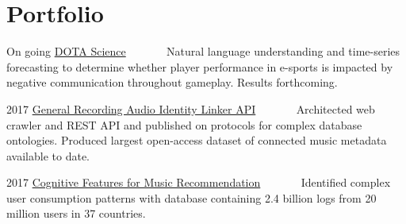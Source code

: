 \documentclass[letterpaper]{twentysecondcv} %
\begin{document}
\section{Portfolio}
\begin{portfolio}
\portfolioitem
    {On going}
    {\href{https://www.github.com/mmustaine/DOTA-Science}{DOTA Science}}
    {\faAndroid~~\faLineChart~~\faCommenting~~\faFileTextO}
    {
    {Natural language understanding and time-series forecasting to determine whether player performance in e-sports is impacted by negative communication throughout gameplay. Results forthcoming.}
    }

    
\portfolioitem
    {2017}
    {\href{https://dl.acm.org/citation.cfm?id=3144760}{General Recording Audio Identity Linker API}} {\faDatabase~~\faCode~~\faWpforms~~\faPieChart}
    {
    {Architected web crawler and REST API and published on protocols for complex database ontologies. Produced largest open-access dataset of connected music metadata available to date.}
    }

\portfolioitem
    {2017}
    {\href{http://journal.frontiersin.org/article/10.3389/fpsyg.2017.00931}{Cognitive Features for Music Recommendation}} {\faUsers~~\faCommenting~~\faDatabase~~\faCogs}
    {
    {Identified complex user consumption patterns with database containing 2.4 billion logs from 20 million users in 37 countries.}
    }

\end{portfolio}
% 
%  

\end{document}
